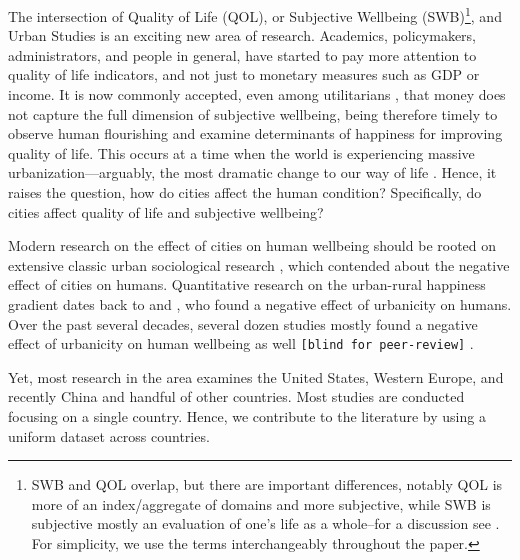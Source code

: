 \documentclass[10pt, letterpaper]{article}
\begin{document}
The intersection of Quality of Life (QOL), or Subjective Wellbeing (SWB)\footnote{SWB and QOL overlap, but there are important differences, notably QOL is more of an index/aggregate of domains and more subjective, while SWB is subjective mostly an evaluation of one's life as a whole--for a discussion see \citet{aok-swbLivability18}. For simplicity, we use the terms interchangeably throughout the paper.}, and Urban Studies is an exciting new area of research.
Academics, policymakers, administrators, and people in general, have started to pay more
attention to quality of life indicators, and not just to monetary measures such as GDP or income. It is now commonly accepted, even among utilitarians
\citep{stiglitz09al}, that money does not capture the full dimension of subjective wellbeing, being therefore timely to observe human flourishing and examine determinants of happiness for improving quality of life. This occurs at a time when the world is experiencing massive
urbanization---arguably, the most dramatic change to our way of life \cite{wirth38,hansonCityJournalautumn15}. Hence, it raises the question, how do cities affect the human condition? Specifically, do cities affect quality of life and subjective wellbeing?


Modern research on the effect of cities on human wellbeing should be rooted on
extensive classic urban sociological research \citep{tonnies57,wirth38,simmel03,park15,park84}, 
which contended about the negative effect of cities on humans.
%
Quantitative research on the urban-rural happiness gradient dates back to
\cite{gurin60} and \cite{campbell76etal}, who found a negative effect of urbanicity on humans. Over the past several decades, several dozen studies mostly found a negative effect of urbanicity on human wellbeing as well
\texttt{[blind for peer-review]}%
. 

Yet, most research in the area examines the United States, Western Europe, and recently China and handful of other countries. Most studies are conducted focusing on a single country. Hence, we contribute to the literature by using a uniform dataset across countries.
\end{document}
